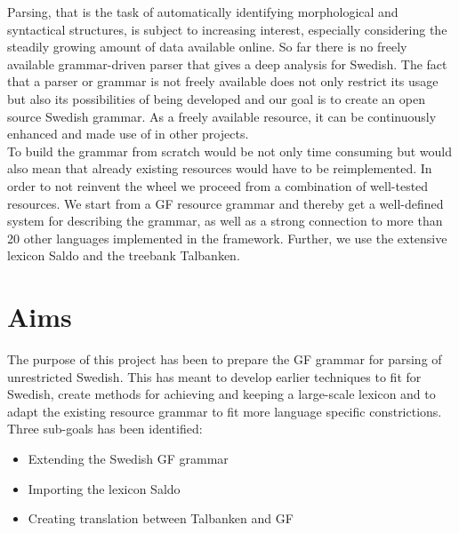 \documentclass{report}
\begin{document}
Parsing, that is the task of automatically identifying morphological and
syntactical structures, is subject to increasing interest, especially
considering the steadily growing amount of data available online. 
So far there is no freely available grammar-driven parser that gives a deep
analysis for Swedish. The fact that %
a parser or grammar is not freely available does not only restrict its
usage but also its possibilities of being developed and our
goal is
to create an open source Swedish grammar. %
As a freely available resource, it can be continuously enhanced and
made use of in other projects.\\
To build the grammar from scratch would be not only time consuming but
would also mean that already existing resources would have to be reimplemented.
In order to not reinvent the wheel we proceed from a combination of well-tested
resources.
We start from a GF resource grammar and thereby get
a well-defined system for describing the grammar, as well as a strong connection to
more than 20 other languages implemented in the framework. Further, we use
the extensive lexicon Saldo and the treebank Talbanken.


\section{Aims}
The purpose of this project has been to prepare the GF grammar for parsing of 
unrestricted Swedish.
This has meant to develop earlier techniques to fit for Swedish, create methods
for achieving and keeping a large-scale lexicon and to adapt the existing
resource grammar to fit more language specific constrictions.
Three sub-goals has been identified:
\begin{itemize}
\item Extending the Swedish GF grammar
\item Importing the lexicon Saldo
\item Creating translation between Talbanken and GF
\end{itemize}
\end{document}
